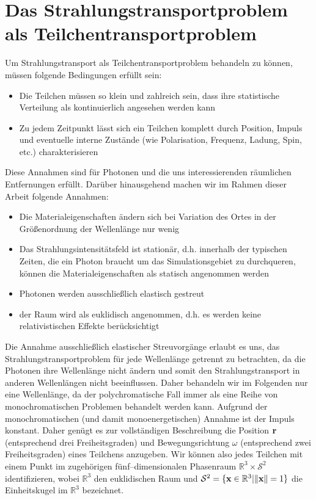 	\section{Das Strahlungstransportproblem als Teilchentransportproblem}
	Um Strahlungstransport als Teilchentransportproblem behandeln zu können, müssen folgende Bedingungen erfüllt sein:
	\begin{itemize}
		\item{Die Teilchen müssen so klein und zahlreich sein, dass ihre statistische Verteilung als kontinuierlich angesehen werden kann}
		\item{Zu jedem Zeitpunkt lässt sich ein Teilchen komplett durch Position, Impuls und eventuelle interne Zustände (wie Polarisation, Frequenz, Ladung, Spin, etc.) charakterisieren}
	\end{itemize}
	Diese Annahmen sind für Photonen und die uns interessierenden räumlichen Entfernungen erfüllt.
	Darüber hinausgehend machen wir im Rahmen dieser Arbeit folgende Annahmen:
	\begin{itemize}
		\item{Die Materialeigenschaften ändern sich bei Variation des Ortes in der Größenordnung der Wellenlänge nur wenig}
		\item{Das Strahlungsintensitätsfeld ist stationär, d.h. innerhalb der typischen Zeiten, die ein Photon braucht um das Simulationsgebiet zu durchqueren, können die Materialeigenschaften als statisch angenommen werden}
		\item{Photonen werden ausschließlich elastisch gestreut}
		\item{der Raum wird als euklidisch angenommen, d.h. es werden keine relativistischen Effekte berücksichtigt}
	\end{itemize}
	Die Annahme ausschließlich elastischer Streuvorgänge erlaubt es uns, das Strahlungstransportproblem für jede Wellenlänge getrennt zu betrachten, da die Photonen ihre Wellenlänge nicht ändern und somit den Strahlungstransport in anderen Wellenlängen nicht beeinflussen. Daher behandeln wir im Folgenden nur eine Wellenlänge, da der polychromatische Fall immer als eine Reihe von monochromatischen Problemen behandelt werden kann. Aufgrund der monochromatischen (und damit monoenergetischen) Annahme ist der Impuls konstant. Daher genügt es zur vollständigen Beschreibung die Position $\mathbf{r}$ (entsprechend drei Freiheitsgraden) und Bewegungsrichtung $\omega$ (entsprechend zwei Freiheitsgraden) eines Teilchens anzugeben. Wir können also jedes Teilchen mit einem Punkt im zugehörigen fünf--dimensionalen Phasenraum $\mathbb{R}^3 \times \mathcal{S}^2$ identifizieren, wobei $\mathbb{R}^3$ den euklidischen Raum und $\mathcal{S}^2=\{\mathbf{x}\in\mathbb{R}^3| \|\mathbf{x}\|=1\}$ die Einheitskugel im $\mathbb{R}^3$ bezeichnet.
	
